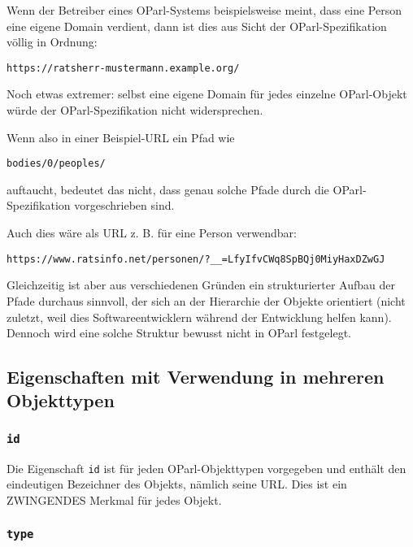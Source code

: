 \documentclass[,a4paper]{article}
\begin{document}
Wenn der Betreiber eines OParl-Systems beispielsweise meint, dass eine
Person eine eigene Domain verdient, dann ist dies aus Sicht der
OParl-Spezifikation völlig in Ordnung:

\begin{verbatim}
https://ratsherr-mustermann.example.org/
\end{verbatim}

Noch etwas extremer: selbst eine eigene Domain für jedes einzelne
OParl-Objekt würde der OParl-Spezifikation nicht widersprechen.

Wenn also in einer Beispiel-URL ein Pfad wie

\begin{verbatim}
bodies/0/peoples/
\end{verbatim}

auftaucht, bedeutet das nicht, dass genau solche Pfade durch die
OParl-Spezifikation vorgeschrieben sind.

Auch dies wäre als URL z. B. für eine Person verwendbar:

\begin{verbatim}
https://www.ratsinfo.net/personen/?__=LfyIfvCWq8SpBQj0MiyHaxDZwGJ
\end{verbatim}

Gleichzeitig ist aber aus verschiedenen Gründen ein strukturierter
Aufbau der Pfade durchaus sinnvoll, der sich an der Hierarchie der
Objekte orientiert (nicht zuletzt, weil dies Softwareentwicklern während
der Entwicklung helfen kann). Dennoch wird eine solche Struktur bewusst
nicht in OParl festgelegt.

\subsection{Eigenschaften mit Verwendung in mehreren
Objekttypen}\label{eigenschaften-mit-verwendung-in-mehreren-objekttypen}

\subsubsection{\texttt{id}}\label{id}

Die Eigenschaft \texttt{id} ist für jeden OParl-Objekttypen vorgegeben
und enthält den eindeutigen Bezeichner des Objekts, nämlich seine URL.
Dies ist ein ZWINGENDES Merkmal für jedes Objekt.

\subsubsection{\texttt{type}}\label{type}
\end{document}
